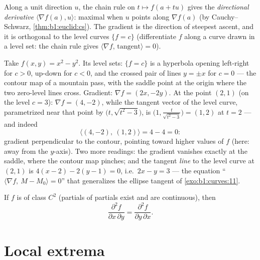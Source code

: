 \begin{remark}
Along a unit direction $u$, the chain rule on $t \mapsto f(a + tu)$
gives the \emph{directional derivative} $\langle \nabla f(a),
u\rangle$: maximal when $u$ points along $\nabla f(a)$ (by
Cauchy--Schwarz, \cref{thm:b1:euclid:cs}). The gradient is the
direction of steepest ascent, and it is orthogonal to the level
curves $\{f = c\}$ (differentiate $f$ along a curve drawn in a
level set: the chain rule gives $\langle\nabla f,\,
\text{tangent}\rangle = 0$).
\end{remark}

\begin{example}
\label{ex:b1:multivar:levelcurves}
Take $f(x, y) = x^2 - y^2$. Its level sets: $\{f = c\}$ is a
hyperbola opening left-right for $c > 0$, up-down for $c < 0$,
and the crossed pair of lines $y = \pm x$ for $c = 0$ --- the
contour map of a mountain pass, with the saddle point at the
origin where the two zero-level lines cross. Gradient: $\nabla
f = (2x, -2y)$. At the point $(2, 1)$ (on the level $c = 3$):
$\nabla f = (4, -2)$, while the tangent vector of the level
curve, parametrized near that point by $\bigl(t,
\sqrt{t^2 - 3}\bigr)$, is $\bigl(1, \frac{t}{\sqrt{t^2 -
3}}\bigr) = (1, 2)$ at $t = 2$ --- and indeed
\[
\langle (4, -2),\ (1, 2)\rangle = 4 - 4 = 0 :
\]
gradient perpendicular to the contour, pointing toward higher
values of $f$ (here: away from the $y$-axis). Two more
readings: the gradient vanishes exactly at the saddle, where
the contour map pinches; and the tangent \emph{line} to the
level curve at $(2,1)$ is $4(x - 2) - 2(y - 1) = 0$, i.e.\ $2x -
y = 3$ --- the equation ``$\langle \nabla f,\ M - M_0\rangle =
0$'' that generalizes the ellipse tangent of
\cref{exo:b1:curves:11}.
\end{example}

\begin{theorem}[Schwarz]\label{thm:b1:multivar:schwarz}
If $f$ is of class $C^2$ (partials of partials exist and are
continuous), then
\[
\frac{\partial^2 f}{\partial x\,\partial y}
= \frac{\partial^2 f}{\partial y\,\partial x} .
\]
\end{theorem}
\admitted

\section{Local extrema}

